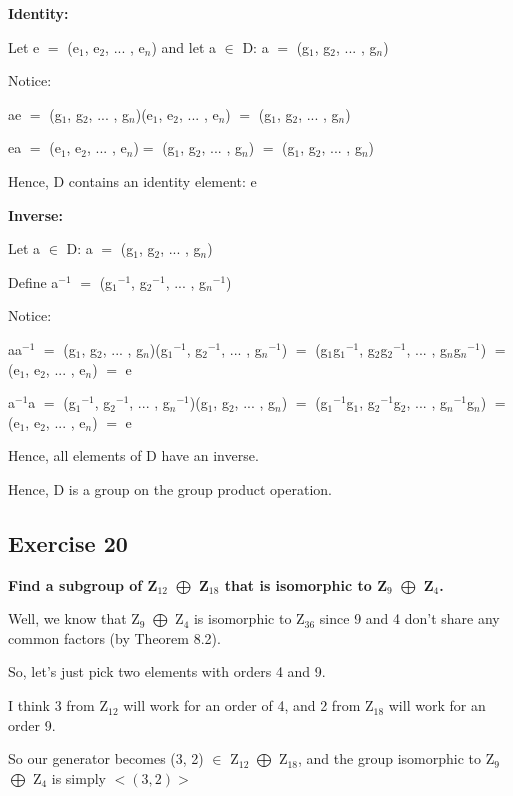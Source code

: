 \documentclass{article}
\newcommand{\mt}[1]{\ensuremath{#1}}
\newcommand\ssc[2][\DefaultOpt]{%
  \def\DefaultOpt{#2}%
  \subsection[#1]{#2}%
}
\newcommand{\mem}{\mt{\in} }
\newcommand{\eql}{\mt{=} }
\newcommand{\uw}[2]{#1\mt{_{#2}}}
\newcommand{\uf}[2]{#1\mt{^{#2}}}
\newcommand{\edp}{\mt{\bigoplus} }
\begin{document}
{{\textbf{Identity:}

Let e \eql (\uw{e}{1}, \uw{e}{2}, ... , \uw{e}{n}) and let a \mem D: a \eql (\uw{g}{1}, \uw{g}{2}, ... , \uw{g}{n}) 

Notice: 

ae \eql (\uw{g}{1}, \uw{g}{2}, ... , \uw{g}{n})(\uw{e}{1}, \uw{e}{2}, ... , \uw{e}{n}) \eql (\uw{g}{1}, \uw{g}{2}, ... , \uw{g}{n})

ea \eql (\uw{e}{1}, \uw{e}{2}, ... , \uw{e}{n})\eql (\uw{g}{1}, \uw{g}{2}, ... , \uw{g}{n}) \eql (\uw{g}{1}, \uw{g}{2}, ... , \uw{g}{n})

Hence, D contains an identity element: e 

\textbf{Inverse:}

Let a \mem D: a \eql (\uw{g}{1}, \uw{g}{2}, ... , \uw{g}{n}) 

Define \uf{a}{-1} \eql (\uf{\uw{g}{1}}{-1}, \uf{\uw{g}{2}}{-1}, ... , \uf{\uw{g}{n}}{-1}) 

Notice:

a\uf{a}{-1} \eql (\uw{g}{1}, \uw{g}{2}, ... , \uw{g}{n})(\uf{\uw{g}{1}}{-1}, \uf{\uw{g}{2}}{-1}, ... , \uf{\uw{g}{n}}{-1}) \eql (\uw{g}{1}\uf{\uw{g}{1}}{-1}, \uw{g}{2}\uf{\uw{g}{2}}{-1}, ... , \uw{g}{n}\uf{\uw{g}{n}}{-1}) \eql (\uw{e}{1}, \uw{e}{2}, ... , \uw{e}{n}) \eql e

\uf{a}{-1}a \eql (\uf{\uw{g}{1}}{-1}, \uf{\uw{g}{2}}{-1}, ... , \uf{\uw{g}{n}}{-1})(\uw{g}{1}, \uw{g}{2}, ... , \uw{g}{n}) \eql (\uf{\uw{g}{1}}{-1}\uw{g}{1}, \uf{\uw{g}{2}}{-1}\uw{g}{2}, ... , \uf{\uw{g}{n}}{-1}\uw{g}{n}) \eql (\uw{e}{1}, \uw{e}{2}, ... , \uw{e}{n}) \eql e

Hence, all elements of D have an inverse.

Hence, D is a group on the group product operation.
}

\newpage

\ssc{Exercise 20}{
\textbf{Find a subgroup of \uw{Z}{12} \edp \uw{Z}{18} that is isomorphic to \uw{Z}{9} \edp \uw{Z}{4}.}

Well, we know that \uw{Z}{9} \edp \uw{Z}{4} is isomorphic to \uw{Z}{36} since 9 and 4 don't share any common factors (by Theorem 8.2).

So, let's just pick two elements with orders 4 and 9.

I think 3 from \uw{Z}{12} will work for an order of 4, and 2 from \uw{Z}{18} will work for an order 9.

So our generator becomes (3, 2) \mem \uw{Z}{12} \edp \uw{Z}{18}, and the group isomorphic to \uw{Z}{9} \edp \uw{Z}{4} is simply \mt{<(3, 2)>}

}}
\end{document}
